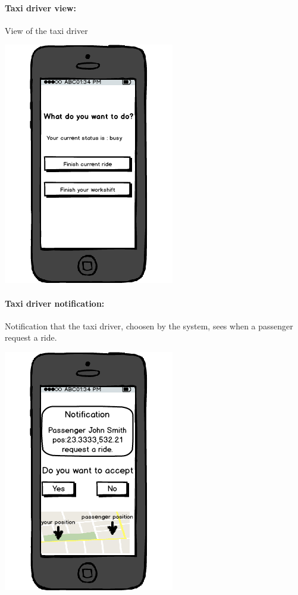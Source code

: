 \paragraph{Taxi driver view:}
View of the taxi driver
\begin{center}
	\includegraphics[scale=0.5]{mockup/taxiDriverFunctions.png}
\end{center}
\newpage
\paragraph{Taxi driver notification:}
Notification that the taxi driver, choosen by the system, sees when a passenger request a ride.
\begin{center}
	\includegraphics[scale=0.5]{mockup/taxiDriverNotification.png}
\end{center}
